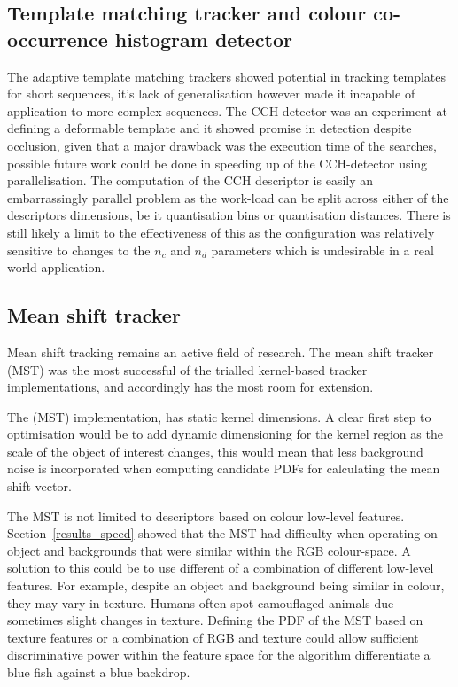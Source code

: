 \subsection{Template matching tracker and colour co-occurrence histogram detector}\label{future_tmt}
The adaptive template matching trackers showed potential in tracking templates for
short sequences, it's lack of generalisation however made it incapable of
application to more complex sequences. 
The CCH-detector was an experiment at defining a deformable template
and it showed promise in detection despite occlusion, given that a major
drawback was the execution time of the searches, possible future work could be
done in speeding up of the CCH-detector using parallelisation. The computation
of the CCH descriptor is easily an embarrassingly parallel problem as the
work-load can be split across either of the descriptors dimensions, be it
quantisation bins or quantisation distances. 
There is still likely a limit to the effectiveness of this as the configuration
was relatively sensitive to changes to the $n_c$ and $n_d$ parameters which is
undesirable in a real world application.

\subsection{Mean shift tracker}\label{future_mst}
Mean shift tracking remains an active field of research. The mean shift tracker
(MST) was the most successful of the trialled kernel-based tracker implementations, and
accordingly has the most room for extension.

The (MST) implementation, has static kernel dimensions. A clear first
step to optimisation would be to add dynamic dimensioning for the kernel region
as the scale of the object of interest changes, this would mean that less
background noise is incorporated when computing candidate PDFs for calculating
the mean shift vector.

The MST is not limited to descriptors based on colour low-level features.
Section~\ref{results_speed} showed that the MST had difficulty when operating on
object and backgrounds that were similar within the RGB colour-space. A solution
to this could be to use different of a combination of different low-level
features. For example, despite an object and background being similar in colour,
they may vary in texture. Humans often spot camouflaged animals due sometimes
slight changes in texture. 
Defining the PDF of the MST based on texture features or a combination of RGB
and texture could allow sufficient discriminative power within the feature space
for the algorithm differentiate a blue fish against a blue backdrop.

